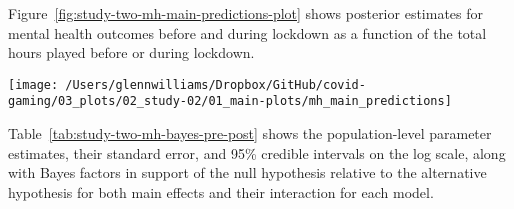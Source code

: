 \documentclass[
  english,
  man,floatsintext]{apa6}
\begin{document}
Figure~\ref{fig:study-two-mh-main-predictions-plot} shows posterior estimates for mental health outcomes before and during lockdown as a function of the total hours played before or during lockdown.

\begin{figure*}[!htbp]

{\centering \texttt{[image: /Users/glennwilliams/Dropbox/GitHub/covid-gaming/03\_plots/02\_study-02/01\_main-plots/mh\_main\_predictions]} 

}

\caption{Mental health outcomes for the depression, anxiety, stress, and loneliness measures as a function of total hours played before and during lockdown. Lines and ribbons indicate the posterior median ± 95\% credible intervals.}\label{fig:study-two-mh-main-predictions-plot}
\end{figure*}

Table~\ref{tab:study-two-mh-bayes-pre-post} shows the population-level parameter estimates, their standard error, and 95\% credible intervals on the log scale, along with Bayes factors in support of the null hypothesis relative to the alternative hypothesis for both main effects and their interaction for each model.
\end{document}
